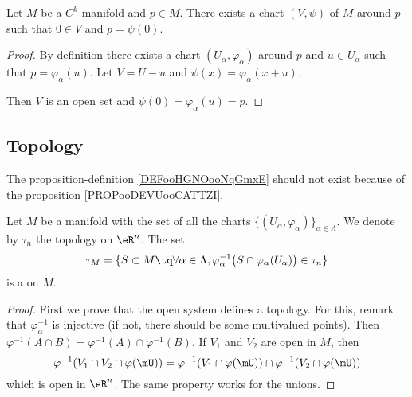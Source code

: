 \begin{lemma}       \label{LEMooOPPJooXezOHS}
	Let \( M\) be a \( C^k\) manifold and \( p\in M\). There exists a chart \( (V,\psi)\) of \( M\) around \( p\) such that \( 0\in V\) and \( p=\psi(0)\).
\end{lemma}

\begin{proof}
	By definition there exists a chart \( (U_{\alpha},\varphi_{\alpha})\) around \( p\) and \( u\in U_{\alpha}\) such that \( p=\varphi_{\alpha}(u)\). Let \( V=U-u\) and \( \psi(x)=\varphi_{\alpha}(x+u)\).

	Then \( V\) is an open set and \( \psi(0)=\varphi_{\alpha}(u)=p\).
\end{proof}

\subsection{Topology}

\begin{probleme}  \label{PROBooGNZMooFknpBn}
	The proposition-definition \ref{DEFooHGNOooNqGmxE} should not exist because of the proposition \ref{PROPooDEVUooCATTZI}.
\end{probleme}

\begin{propositionDef}      \label{DEFooHGNOooNqGmxE}
	Let \( M\) be a manifold with the set of all the charts \( \{ (U_{\alpha}, \varphi_{\alpha}) \}_{\alpha\in \Lambda}\). We denote by \( \tau_{n}\) the topology on \( \eR^n\).
	The set
	\begin{equation}
		\tau_M=\{ S\subset M\tq \forall \alpha\in \Lambda, \varphi_{\alpha}^{-1}\big( S\cap \varphi_{\alpha}(U_{\alpha}) \big) \in \tau_n \}
	\end{equation}
	is a  on \( M\).
\end{propositionDef}

\begin{proof}
	First we prove that the open system defines a topology. For this, remark that $\varphi_{\alpha}^{-1}$ is injective (if not, there should be some multivalued points). Then $\varphi^{-1}(A\cap B)=\varphi^{-1}(A)\cap\varphi^{-1}(B)$. If $V_1$ and $V_2$ are open in $M$, then
	\begin{equation}
		\varphi^{-1}(V_1\cap V_2\cap\varphi(\mU))=\varphi^{-1}(V_1\cap\varphi(\mU))\cap\varphi^{-1}(V_2\cap\varphi(\mU))
	\end{equation}
	which is open in $\eR^n$. The same property works for the unions.
\end{proof}

